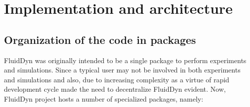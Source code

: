 \section{Implementation and architecture}


\subsection{Organization of the code in packages}

FluidDyn was originally intended to be a single package to perform experiments
and simulations. Since a typical user may not be involved in both experiments
and simulations and also, due to increasing complexity as a virtue of rapid
development cycle made the need to decentralize FluidDyn evident.
Now, FluidDyn project hosts a number of specialized packages, namely:

